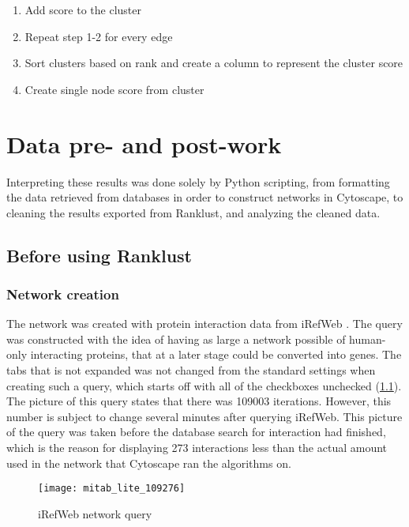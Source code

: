 \begin{enumerate}
    \item Add score to the cluster
    \item Repeat step 1-2 for every edge
    \item Sort clusters based on rank and create a column to represent the
        cluster score
    \item Create single node score from cluster
\end{enumerate}

\chapter{Data pre- and post-work}
Interpreting these results was done solely by Python scripting, from formatting
the data retrieved from databases in order to construct networks in Cytoscape,
to cleaning the results exported from Ranklust, and analyzing the cleaned data. 

\section{Before using Ranklust}
\subsection{Network creation}
The network was created with protein interaction data from iRefWeb
\cite{irefweb}. The query was constructed with the idea of having as large
a network possible of human-only interacting proteins, that at a later stage
could be converted into genes. The tabs that is not expanded was not changed
from the standard settings when creating such a query, which starts off with all
of the checkboxes unchecked (\ref{fig:irefweb}). The picture of this query
states that there was 109003 iterations. However, this number is subject to
change several minutes after querying iRefWeb. This picture of the query was
taken before the database search for interaction had finished, which is the
reason for displaying 273 interactions less than the actual amount used in the
network that Cytoscape ran the algorithms on.
\begin{figure}
    \centering
    \texttt{[image: mitab\_lite\_109276]}
    \caption{iRefWeb network query}
    \label{fig:irefweb}
\end{figure}

